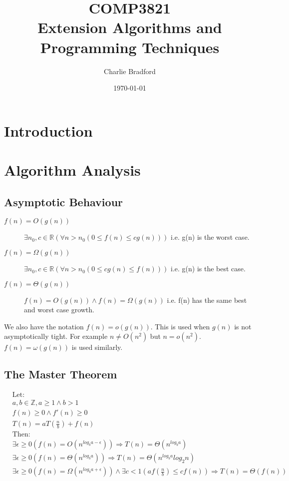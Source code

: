 \documentclass[a4paper]{article}
\title{%
		COMP3821 \\
\large Extension Algorithms and Programming Techniques}
\author{Charlie Bradford}
\date{\today}
\begin{document}
\maketitle

\section{Introduction}

\section{Algorithm Analysis}

\subsection{Asymptotic Behaviour}
\begin{description}
		\item[$f(n) = O(g(n))$] $\exists n_0, c \in \mathbb{R}(\forall n > n_0(0 \leq f(n) \leq cg(n)))$ i.e. g(n) is the worst case.
		\item[$f(n) = \Omega(g(n))$] $\exists n_0, c \in \mathbb{R}(\forall n > n_0(0 \leq cg(n) \leq f(n)))$ i.e. g(n) is the best case.
		\item[$f(n) = \Theta(g(n))$] $ f(n) = O(g(n)) \land f(n) = \Omega(g(n)) $ i.e. f(n) has the same best and worst case growth. 
\end{description}
We also have the notation $f(n) = o(g(n))$. This is used when $g(n)$ is not asymptotically tight. For example $n \neq O(n^2)$ but $n = o(n^2)$. $f(n) = \omega(g(n))$ is used similarly.

\subsection{The Master Theorem}
\begin{align*}
		& \text{Let:} \\
		& a, b \in \mathbb{Z}, a \geq 1 \land b > 1 \\
		& f(n) \ge 0 \land f'(n) \geq 0 \\
		& T(n) = aT(\frac{n}{b}) + f(n) \\
		& \text{Then:} \\
		& \exists \epsilon \ge 0 (f(n) = O(n^{log_{b}a - \epsilon})) \Rightarrow T(n) = \Theta(n^{log_{b}a}) \\
		& \exists \epsilon \ge 0 (f(n) = \Theta(n^{log_{b}a})) \Rightarrow T(n) = \Theta(n^{log_{b}a}log_{2}n) \\
		& \exists \epsilon \ge 0 (f(n) = \Omega(n^{log_{b}a + \epsilon}))\land \exists c < 1(af(\frac{n}{b}) \leq cf(n)) \Rightarrow T(n) = \Theta(f(n))
\end{align*}
\end{document}
